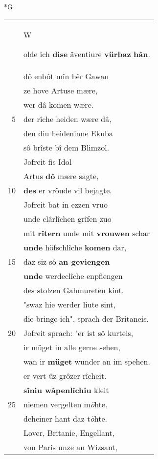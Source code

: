 \documentclass[8pt,a4paper,notitlepage]{article}
\begin{document}
\begin{table}[ht]
\begin{minipage}[t]{0.5\linewidth}
\small
\begin{center}*G
\end{center}
\begin{tabular}{rl}
 & \begin{large}W\end{large}olde ich \textbf{dise} âventiure \textbf{vürbaz} \textbf{hân}.\\ 
 & dô enbôt mîn hêr Gawan\\ 
 & ze hove Artuse mære,\\ 
 & wer dâ komen wære.\\ 
5 & der rîche heiden wære dâ,\\ 
 & den diu heideninne Ekuba\\ 
 & sô brîste bî dem Blimzol.\\ 
 & Jofreit fis Idol\\ 
 & Artus \textbf{dô} mære sagte,\\ 
10 & \textbf{des} er vröude vil bejagte.\\ 
 & Jofreit bat in ezzen vruo\\ 
 & unde clârlîchen grîfen zuo\\ 
 & mit \textbf{rîtern} unde mit \textbf{vrouwen} schar\\ 
 & \textbf{unde} höfschlîche \textbf{komen} dar,\\ 
15 & daz siz sô \textbf{an geviengen}\\ 
 & \textbf{unde} werdeclîche enpfiengen\\ 
 & des stolzen Gahmureten kint.\\ 
 & "swaz hie werder liute sint,\\ 
 & die bringe ich", sprach der Britaneis.\\ 
20 & Jofreit sprach: "er ist sô kurteis,\\ 
 & ir müget in alle gerne sehen,\\ 
 & wan ir \textbf{müget} wunder an im spehen.\\ 
 & er vert ûz grôzer rîcheit.\\ 
 & \textbf{sîniu wâpenlîchiu} kleit\\ 
25 & niemen vergelten m\textit{ö}hte.\\ 
 & deheiner hant daz t\textit{ö}hte.\\ 
 & Lover, Britanie, Engellant,\\ 
 & von Paris unze an Wizsant,\\ 

\end{tabular}
\end{minipage}
\end{table}
\end{document}

